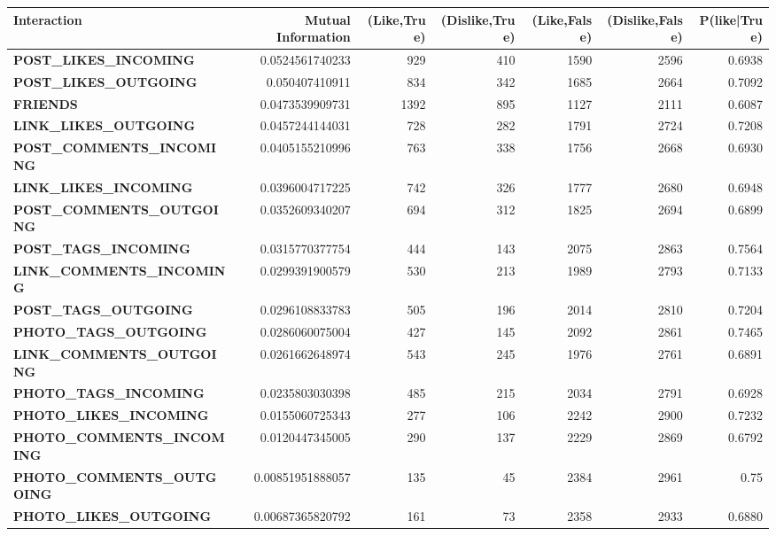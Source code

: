 \begin{table}
	\centering
	\begin{tabular}{| >{\small}l | >{\small}r | >{\small}r | >{\small}r | >{\small}r | >{\small}r | >{\small}r |}
	\hline
	Interaction & Mutual Information & (Like,True) & (Dislike,True) & (Like,False) & (Dislike,False)& P(like|True)\\
	\hline
	\textbf{POST\_LIKES\_INCOMING} & 0.0524561740233 & 929 & 410 & 1590 & 2596 & 0.6938\\
	\hline
	\textbf{POST\_LIKES\_OUTGOING}& 0.050407410911 & 834 & 342 & 1685 & 2664 & 0.7092\\
	\hline
	\textbf{FRIENDS} & 0.0473539909731 & 1392 & 895 & 1127 & 2111 & 0.6087\\
	\hline
	\textbf{LINK\_LIKES\_OUTGOING}& 0.0457244144031 & 728 & 282 & 1791 & 2724 & 0.7208\\
	\hline
	\textbf{POST\_COMMENTS\_INCOMING}& 0.0405155210996 & 763 & 338 & 1756 & 2668& 0.6930\\
	\hline
	\textbf{LINK\_LIKES\_INCOMING}& 0.0396004717225 & 742 & 326 & 1777 & 2680 & 0.6948\\
	\hline
	\textbf{POST\_COMMENTS\_OUTGOING}& 0.0352609340207 & 694 & 312 & 1825 & 2694 & 0.6899\\
	\hline
	\textbf{POST\_TAGS\_INCOMING}& 0.0315770377754 & 444 & 143 & 2075 & 2863 & 0.7564\\
	\hline
	\textbf{LINK\_COMMENTS\_INCOMING}& 0.0299391900579 & 530 & 213 & 1989 & 2793 & 0.7133 \\
	\hline
	\textbf{POST\_TAGS\_OUTGOING}& 0.0296108833783 & 505 & 196 & 2014 & 2810 & 0.7204\\
	\hline
	\textbf{PHOTO\_TAGS\_OUTGOING}& 0.0286060075004 & 427 & 145 & 2092 & 2861 & 0.7465\\
	\hline
	\textbf{LINK\_COMMENTS\_OUTGOING}& 0.0261662648974 & 543 & 245 & 1976 & 2761 & 0.6891\\
	\hline
	\textbf{PHOTO\_TAGS\_INCOMING}& 0.0235803030398 & 485 & 215 & 2034 & 2791 & 0.6928\\
	\hline
	\textbf{PHOTO\_LIKES\_INCOMING}& 0.0155060725343 & 277 & 106 & 2242 & 2900 & 0.7232\\
	\hline
	\textbf{PHOTO\_COMMENTS\_INCOMING}& 0.0120447345005 & 290 & 137 & 2229 & 2869 & 0.6792\\
	\hline
	\textbf{PHOTO\_COMMENTS\_OUTGOING}& 0.00851951888057 & 135 & 45 & 2384 & 2961& 0.75\\
	\hline
	\textbf{PHOTO\_LIKES\_OUTGOING}& 0.00687365820792 & 161 & 73 & 2358 & 2933 & 0.6880\\

\end{tabular}
\end{table}
